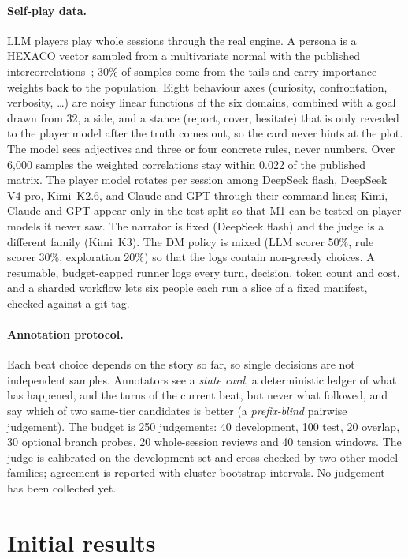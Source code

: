 \documentclass{article}
\begin{document}
\paragraph{Self-play data.}
\label{sec:data}
LLM players play whole sessions through the real engine. A persona is a HEXACO vector sampled from a multivariate normal with the published intercorrelations~\citep{moshagen2019hexaco}; 30\% of samples come from the tails and carry importance weights back to the population. Eight behaviour axes (curiosity, confrontation, verbosity, \dots) are noisy linear functions of the six domains, combined with a goal drawn from 32, a side, and a stance (report, cover, hesitate) that is only revealed to the player model after the truth comes out, so the card never hints at the plot. The model sees adjectives and three or four concrete rules, never numbers. Over 6{,}000 samples the weighted correlations stay within 0.022 of the published matrix. The player model rotates per session among DeepSeek flash, DeepSeek V4-pro, Kimi~K2.6, and Claude and GPT through their command lines; Kimi, Claude and GPT appear only in the test split so that M1 can be tested on player models it never saw. The narrator is fixed (DeepSeek flash) and the judge is a different family (Kimi~K3). The DM policy is mixed (LLM scorer 50\%, rule scorer 30\%, exploration 20\%) so that the logs contain non-greedy choices. A resumable, budget-capped runner logs every turn, decision, token count and cost, and a sharded workflow lets six people each run a slice of a fixed manifest, checked against a git tag.

\paragraph{Annotation protocol.}
Each beat choice depends on the story so far, so single decisions are not independent samples. Annotators see a \emph{state card}, a deterministic ledger of what has happened, and the turns of the current beat, but never what followed, and say which of two same-tier candidates is better (a \emph{prefix-blind} pairwise judgement). The budget is 250 judgements: 40 development, 100 test, 20 overlap, 30 optional branch probes, 20 whole-session reviews and 40 tension windows. The judge is calibrated on the development set and cross-checked by two other model families; agreement is reported with cluster-bootstrap intervals. No judgement has been collected yet.

\section{Initial results}
\label{sec:results}
\end{document}
